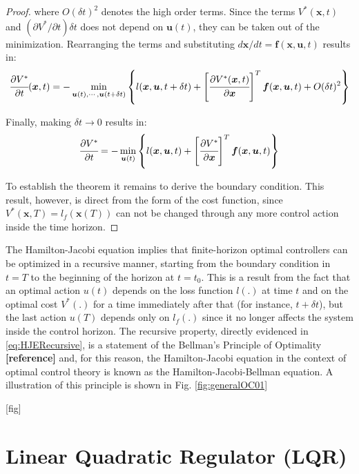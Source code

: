 \documentclass[a4paper,11pt]{book}
\numberwithin{figure}{chapter}
\numberwithin{equation}{chapter}
\numberwithin{table}{chapter}
\theoremstyle{definition}
\begin{document}
\begin{proof}
\noindent where $O(\delta t)^2$ denotes the high order terms. Since the terms $V^*(\bm{x}, t)$ and $(\partial V^*/\partial t) \delta t$ does not depend on $\bm{u}(t)$, they can be taken out of the minimization. Rearranging the terms and substituting $d \bm{x} / dt = \bm{f}(\bm{x}, \bm{u}, t)$ results in:
	\begin{equation}
		\cfrac{\partial V^*}{\partial t}(\bm{x}, t) =  - \min_{\bm{u}(t), \cdots, \bm{u}(t+\delta t)} \left\{ l(\bm{x}, \bm{u}, t + \delta t)  + \left[ \cfrac{\partial V^*(\bm{x}, t)}{\partial \bm{x}} \right]^T \bm{f}(\bm{x}, \bm{u}, t) + O(\delta t)^2  \right\}
	\end{equation}
	
	Finally, making $\delta t \to 0$ results in:
	\begin{equation}
		\cfrac{\partial V^*}{\partial t} =  - \min_{\bm{u}(t)} \left\{ l(\bm{x}, \bm{u}, t)  + \left[ \cfrac{\partial V^*}{\partial \bm{x}} \right]^T \bm{f}(\bm{x}, \bm{u}, t) \right\}
	\end{equation}
	
	To establish the theorem it remains to derive the boundary condition. This result, however, is direct from the form of the cost function, since $V^*(\bm{x}, T) = l_f(\bm{x}(T))$ can not be changed through any more control action inside the time horizon.
\end{proof}

The Hamilton-Jacobi equation implies that finite-horizon optimal controllers can be optimized in a recursive manner, starting from the boundary condition in $t = T$ to the beginning of the horizon at $t = t_0$. This is a result from the fact that an optimal action $u(t)$ depends on the loss function $l(.)$ at time $t$ and on the optimal cost $V^*(.)$ for a time immediately after that (for instance, $t+\delta t$), but the last action $u(T)$ depends only on $l_f(.)$ since it no longer affects the system inside the control horizon. The recursive property, directly evidenced in \eqref{eq:HJERecursive}, is a statement of the Bellman's Principle of Optimality \textbf{[reference]} and, for this reason, the Hamilton-Jacobi equation in the context of optimal control theory is known as the Hamilton-Jacobi-Bellman equation. A illustration of this principle is shown in Fig. \ref{fig:generalOC01}

[fig]


\section{Linear Quadratic Regulator (LQR)}
\end{document}
